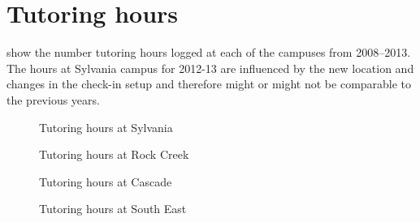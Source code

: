 \chapter{Tutoring hours}\label{app:sec:tutoringhours}

 show
the number tutoring hours logged at each of the campuses from 2008--2013. The hours at Sylvania campus for 2012-13 are influenced by the new location and changes in the check-in setup and therefore might or might not be comparable to the previous years.


\begin{figure}[!htb]
	\captionsetup{skip=0pt}
  \begin{widepage}
  \begin{minipage}{.4\textwidth}
    \centering
	
    \caption{Tutoring hours at Sylvania}
    \label{app:fig:tutoringsylvania}
  \end{minipage}%
  \hfill
  \begin{minipage}{.4\textwidth}
    \centering
	
    \caption{Tutoring hours at Rock Creek}
    \label{app:fig:tutoringrockcreek}
  \end{minipage}%
  \end{widepage}
\end{figure}

\begin{figure}[!htb]
	\captionsetup{skip=0pt}
  \begin{widepage}
  \begin{minipage}{.4\textwidth}
    \centering
	
    \caption{Tutoring hours at Cascade}
    \label{app:fig:tutoringCascade}
  \end{minipage}%
  \hfill
  \begin{minipage}{.4\textwidth}
    \centering
	
    \caption{Tutoring hours at South East}
    \label{app:fig:tutoringsoutheast}
  \end{minipage}%
  \end{widepage}
\end{figure}
